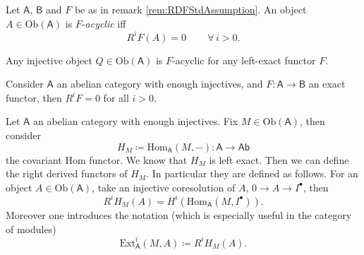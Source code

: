 \begin{defn}
	Let $\mathsf{A}$, $\mathsf{B}$ and $F$ be as in remark \ref{rem:RDFStdAssumption}.
	An object $A \in \mathrm{Ob} \left(\mathsf{A}\right)$ is
	$F$-{\em acyclic} iff
	\begin{equation}
		R^iF(A) = 0 \qquad \,\forall\, i > 0
	.\end{equation} 
\end{defn}

\begin{rem}[]
	Any injective object $Q \in \mathrm{Ob} \left(\mathsf{A}\right)$ is 
	$F$-acyclic for any left-exact functor $F$.
\end{rem}

\begin{lem}
	Consider $\mathsf{A}$ an abelian category with enough injectives, and
	$F\colon\mathsf{A} \to \mathsf{B}$ an exact functor, then
	$R^iF = 0$ for all $i > 0$.
\end{lem} 

\begin{ex}
	Let $\mathsf{A}$ an abelian category with enough injectives.
	Fix $M \in \mathrm{Ob} \left(\mathsf{A}\right)$, then consider
	\begin{equation}
	H_M \coloneqq \mathrm{Hom}_{\mathsf{A}} \left( M, - \right)\colon\mathsf{A} \to \mathsf{Ab}
	\end{equation} 
	the covariant Hom functor.
	We know that $H_M$ is left exact.
	Then we can define the right derived functors of $H_M$.
	In particular they are defined as follows.
	For an object $A \in \mathrm{Ob} \left(\mathsf{A}\right)$,
	take an injective coresolution of $A$, $0 \to A \to I^\bullet$, then
	\begin{equation}
		R^iH_M(A) = H^i \left( \mathrm{Hom}_{\mathsf{A}} \left( M, I^\bullet \right) \right)
	.\end{equation} 
	Moreover one introduces the notation (which is especially useful in the category of modules)
	\begin{equation}
		\mathrm{Ext}_{\mathsf{A}}^i \left( M,A \right) \coloneqq R^i H_M (A)
	.\end{equation} 
\end{ex} 

